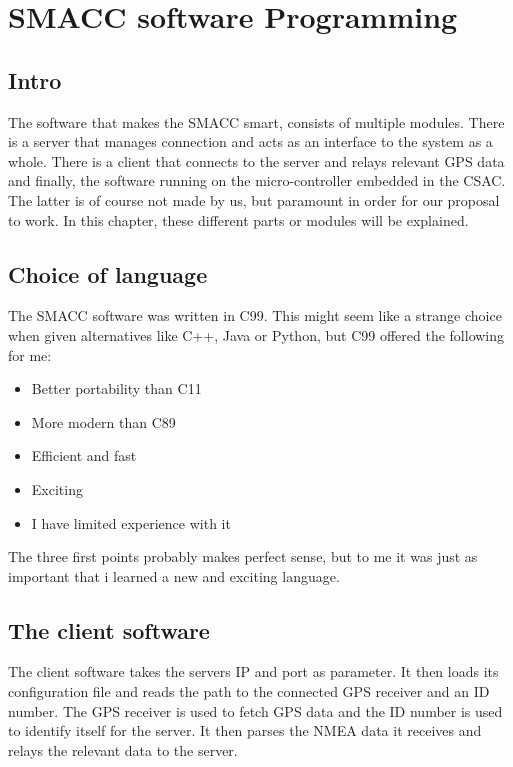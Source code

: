 \documentclass[12pt,english,a4paper]{report}
\begin{document}
\section{SMACC software Programming}

\subsection{Intro}
The software that makes the SMACC smart, consists of multiple modules. There is a server that manages connection and acts as an interface to the system as a whole. There is a client that connects to the server and relays relevant GPS data and finally, the software running on the micro-controller embedded in the CSAC. The latter is of course not made by us, but paramount in order for our proposal to work. In this chapter, these different parts or modules will be explained.

\subsection{Choice of language}
The SMACC software was written in C99. This might seem like a strange choice when given alternatives like C++, Java or Python, but C99 offered the following for me:
\begin{itemize}
  \item Better portability than C11
  \item More modern than C89
  \item Efficient and fast
  \item Exciting
  \item I have limited experience with it
\end{itemize}
The three first points probably makes perfect sense, but to me it was just as important that i learned a new and exciting language. 

\subsection{The client software}
The client software takes the servers IP and port as parameter. It then loads its configuration file and reads the path to the connected GPS receiver and an ID number. The GPS receiver is used to fetch GPS data and the ID number is used to identify itself for the server. It then parses the NMEA data it receives and relays the relevant data to the server. 
\end{document}
